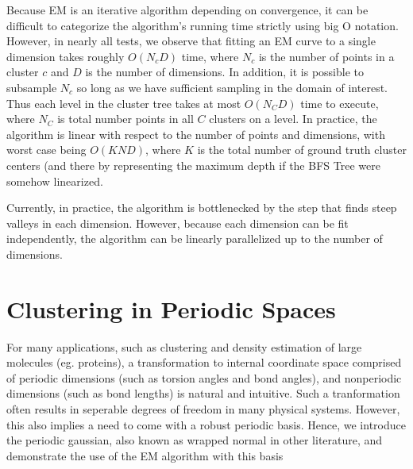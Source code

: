 \documentclass{acm_proc_article-sp}
\begin{document}
Because EM is an iterative algorithm depending on convergence, it can be difficult to categorize the algorithm's running time strictly using big O notation. However, in nearly all tests, we observe that fitting an EM curve to a single dimension takes roughly $O(N_c D)$ time, where $N_c$ is the number of points in a cluster $c$ and $D$ is the number of dimensions. In addition, it is possible to subsample $N_c$ so long as we have sufficient sampling in the domain of interest. Thus each level in the cluster tree takes at most $O(N_C D)$ time to execute, where $N_C$ is total number points in all $C$ clusters on a level. In practice, the algorithm is linear with respect to the number of points and dimensions, with worst case being $O(K N D)$, where $K$ is the total number of ground truth cluster centers (and there by representing the maximum depth if the BFS Tree were somehow linearized. 

Currently, in practice, the algorithm is bottlenecked by the step that finds steep valleys in each dimension. However, because each dimension can be fit independently, the algorithm can be linearly parallelized up to the number of dimensions. 

\section{Clustering in Periodic Spaces}

For many applications, such as clustering and density estimation of large molecules (eg. proteins), a transformation to internal coordinate space comprised of periodic dimensions (such as torsion angles and bond angles), and nonperiodic dimensions (such as bond lengths) is natural and intuitive. Such a tranformation often results in seperable degrees of freedom in many physical systems. However, this also implies a need to come with a robust periodic basis. Hence, we introduce the periodic gaussian, also known as wrapped normal in other literature, and demonstrate the use of the EM algorithm with this basis
\end{document}

